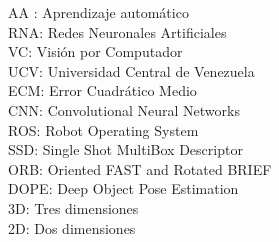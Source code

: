 AA : Aprendizaje automático \\
RNA: Redes Neuronales Artificiales \\
VC: Visión por Computador\\
UCV: Universidad Central de Venezuela\\
ECM: Error Cuadrático Medio \\
CNN: Convolutional Neural Networks\\
ROS: Robot Operating System\\
SSD: Single Shot MultiBox Descriptor\\
ORB: Oriented FAST and Rotated BRIEF\\
DOPE: Deep Object Pose Estimation \\
3D: Tres dimensiones\\
2D: Dos dimensiones \\
